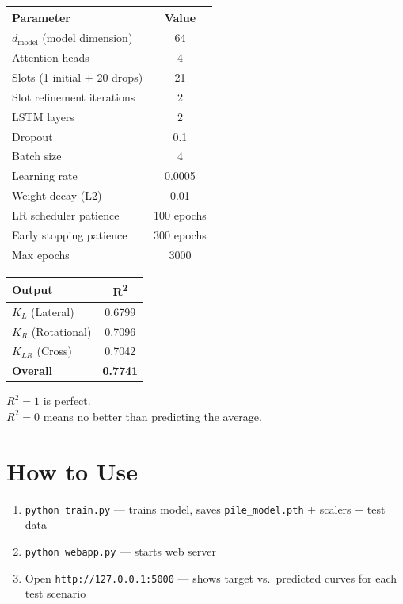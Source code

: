 \documentclass[11pt,a4paper]{article}
\begin{document}
\begin{minipage}[t]{0.55\textwidth}
\renewcommand{\arraystretch}{1.2}
\begin{tabular}{@{}lc@{}}
\toprule
\textbf{Parameter} & \textbf{Value} \\
\midrule
$d_{\text{model}}$ (model dimension) & 64 \\
Attention heads & 4 \\
Slots (1 initial + 20 drops) & 21 \\
Slot refinement iterations & 2 \\
LSTM layers & 2 \\
Dropout & 0.1 \\
Batch size & 4 \\
Learning rate & 0.0005 \\
Weight decay (L2) & 0.01 \\
LR scheduler patience & 100 epochs \\
Early stopping patience & 300 epochs \\
Max epochs & 3000 \\
\bottomrule
\end{tabular}
\end{minipage}%
\hfill
\begin{minipage}[t]{0.38\textwidth}
\renewcommand{\arraystretch}{1.2}
\begin{tabular}{@{}lc@{}}
\toprule
\textbf{Output} & \textbf{R\textsuperscript{2}} \\
\midrule
$K_L$ (Lateral)       & 0.6799 \\
$K_R$ (Rotational)    & 0.7096 \\
$K_{LR}$ (Cross)      & 0.7042 \\
\midrule
\textbf{Overall}      & \textbf{0.7741} \\
\bottomrule
\end{tabular}

\vspace{0.5cm}
$R^2 = 1$ is perfect.\\
$R^2 = 0$ means no better than predicting the average.
\end{minipage}

\section{How to Use}

\begin{enumerate}[nosep]
    \item \texttt{python train.py} --- trains model, saves \texttt{pile\_model.pth} + scalers + test data
    \item \texttt{python webapp.py} --- starts web server
    \item Open \texttt{http://127.0.0.1:5000} --- shows target vs.\ predicted curves for each test scenario
\end{enumerate}
\end{document}
